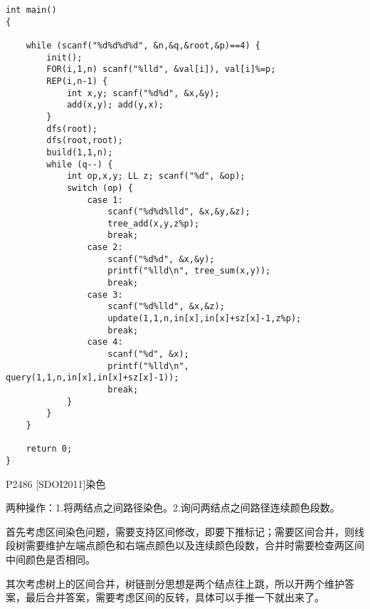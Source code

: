 \begin{lstlisting}
int main()
{

    while (scanf("%d%d%d%d", &n,&q,&root,&p)==4) {
        init();
        FOR(i,1,n) scanf("%lld", &val[i]), val[i]%=p;
        REP(i,n-1) {
            int x,y; scanf("%d%d", &x,&y);
            add(x,y); add(y,x);
        }
        dfs(root);
        dfs(root,root);
        build(1,1,n);
        while (q--) {
            int op,x,y; LL z; scanf("%d", &op);
            switch (op) {
                case 1:
                    scanf("%d%d%lld", &x,&y,&z);
                    tree_add(x,y,z%p);
                    break;
                case 2:
                    scanf("%d%d", &x,&y);
                    printf("%lld\n", tree_sum(x,y));
                    break;
                case 3:
                    scanf("%d%lld", &x,&z);
                    update(1,1,n,in[x],in[x]+sz[x]-1,z%p);
                    break;
                case 4:
                    scanf("%d", &x);
                    printf("%lld\n", query(1,1,n,in[x],in[x]+sz[x]-1));
                    break;
            }
        }
    }

    return 0;
}
\end{lstlisting}

P2486 [SDOI2011]染色

两种操作：1.将两结点之间路径染色。2.询问两结点之间路径连续颜色段数。

首先考虑区间染色问题，需要支持区间修改，即要下推标记；需要区间合并，则线段树需要维护左端点颜色和右端点颜色以及连续颜色段数，合并时需要检查两区间中间颜色是否相同。

其次考虑树上的区间合并，树链剖分思想是两个结点往上跳，所以开两个维护答案，最后合并答案，需要考虑区间的反转，具体可以手推一下就出来了。

